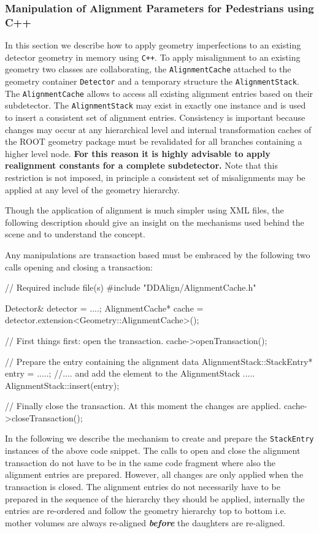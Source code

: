 \documentclass[10pt,a4paper]{article}
\begin{document}
\noindent
\subsubsection{Manipulation of Alignment Parameters for Pedestrians using C++}
\label{sec:ddalign-user-manual-misalignment-manip-cxx}
\noindent
In this section we describe how to apply geometry imperfections to an existing 
detector geometry in memory using {\tt C++}. To apply misalignment to an existing
geometry two classes are collaborating, the {\tt AlignmentCache} attached to
the geometry container {\tt Detector} and a temporary structure the {\tt AlignmentStack}.
The {\tt AlignmentCache} allows to access all existing alignment entries 
based on their subdetector.
The {\tt AlignmentStack} may exist in exactly one instance and is used to
insert a consistent set of alignment entries. Consistency is important because
changes may occur at any hierarchical level and internal transformation caches
of the ROOT geometry package must be revalidated for all branches containing
a higher level node.
{\bf For this reason it is highly advisable to apply realignment constants 
for a complete subdetector.}
Note that this restriction is not imposed, in principle a consistent set 
of misalignments may be applied at any level of the geometry hierarchy.

\noindent
Though the application of alignment is much simpler using XML files, the following
description should give an insight on the mechanisms used behind the scene and
to understand the concept.

\noindent
Any manipulations are transaction based must be embraced by the following two calls
opening and closing a transaction:
\begin{code}
// Required include file(s)
#include "DDAlign/AlignmentCache.h"

    Detector& detector = ....;
    AlignmentCache* cache = detector.extension<Geometry::AlignmentCache>();

    // First things first: open the transaction.
    cache->openTransaction();

    // Prepare the entry containing the alignment data
    AlignmentStack::StackEntry* entry =  .....;
    //.... and add the element to the AlignmentStack .....
    AlignmentStack::insert(entry);

    // Finally close the transaction. At this moment the changes are applied.
    cache->closeTransaction();
\end{code}
In the following we describe the mechanism to create and prepare the 
{\tt StackEntry} instances of the above code snippet. The calls to open and close
the alignment transaction do not have to be in the same code fragment where also
the alignment entries are prepared. However, all changes are only applied when 
the transaction is closed. The alignment entries do not necessarily have to 
be prepared in the sequence of the hierarchy they should be applied, internally
the entries are re-ordered and follow the geometry hierarchy top to bottom
i.e. mother volumes are always re-aligned {\it\bf before} the daughters 
are re-aligned.
\end{document}
